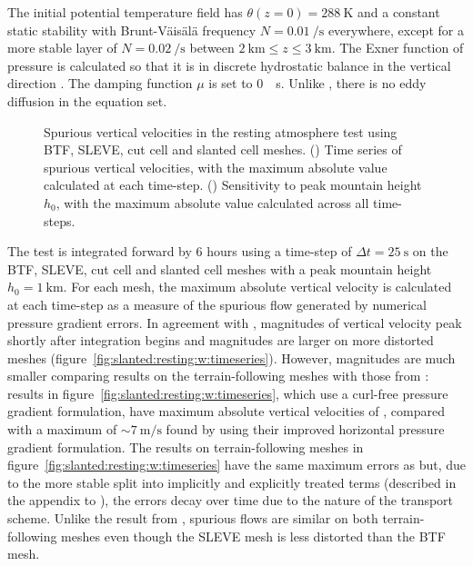 The initial potential temperature field has $\theta(z = 0) = \SI{288}{\kelvin}$ and a constant static stability with Brunt-V\"ais\"al\"a frequency $N = \SI{0.01}{\per\second}$ everywhere, except for a more stable layer of $N = \SI{0.02}{\per\second}$ between $\SI{2}{\kilo\meter} \leq z \leq \SI{3}{\kilo\meter}$.  The Exner function of pressure is calculated so that it is in discrete hydrostatic balance in the vertical direction \citep{weller-shahrokhi2014}.  The damping function \(\mu\) is set to \SI{0}{\per\second}.  Unlike \citet{klemp2011}, there is no eddy diffusion in the equation set.

\begin{figure}
	\centering
	\begin{subfigure}{\textwidth}
		\centering
		
		\label{fig:slanted:resting:w:timeseries}
		\label{fig:slanted:resting:w:max}
	\end{subfigure}
	\caption{Spurious vertical velocities in the resting atmosphere test using BTF, SLEVE, cut cell and slanted cell meshes.
	() Time series of spurious vertical velocities, with the maximum absolute value calculated at each time-step. 
	() Sensitivity to peak mountain height $h_0$, with the maximum absolute value calculated across all time-steps.
	}
	\label{fig:slanted:resting:w}
\end{figure}

The test is integrated forward by \num{6} hours using a time-step of $\Delta t = \SI{25}{\second}$ on the BTF, SLEVE, cut cell and slanted cell meshes with a peak mountain height $h_0 = \SI{1}{\kilo\meter}$.
For each mesh, the maximum absolute vertical velocity is calculated at each time-step as a measure of the spurious flow generated by numerical pressure gradient errors.  In agreement with \citep{klemp2011}, magnitudes of vertical velocity peak shortly after integration begins and magnitudes are larger on more distorted meshes (figure~\ref{fig:slanted:resting:w:timeseries}).
However, magnitudes are much smaller comparing results on the terrain-following meshes with those from \citet{klemp2011}: results in figure~\ref{fig:slanted:resting:w:timeseries}, which use a curl-free pressure gradient formulation, have maximum absolute vertical velocities of \unskip, compared with a maximum of $\sim \SI{7}{\meter\per\second}$ found by \citet{klemp2011} using their improved horizontal pressure gradient formulation.
The results on terrain-following meshes in figure~\ref{fig:slanted:resting:w:timeseries} have the same maximum errors as \citet{weller-shahrokhi2014} but, due to the more stable split into implicitly and explicitly treated terms (described in the appendix to \citet{shaw-weller2016}), the errors decay over time due to the  nature of the transport scheme.
Unlike the result from \citet{klemp2011}, spurious flows are similar on both terrain-following meshes even though the SLEVE mesh is less distorted than the BTF mesh.

